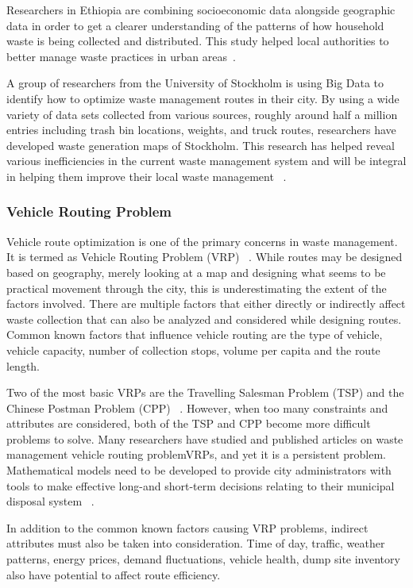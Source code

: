 \documentclass[sigconf]{acmart}
\begin{document}
Researchers in Ethiopia are combining socioeconomic data alongside geographic data in order to get a clearer understanding of the patterns of how household waste is being collected and distributed. This study helped local authorities to better manage waste practices in urban areas~\cite{markvan2016}. 

A group of researchers from the University of Stockholm is using Big Data to identify how to optimize waste management routes in their city. By using a wide variety of data sets collected from various sources, roughly around half a million entries including trash bin locations, weights, and truck routes, researchers have developed waste generation maps of Stockholm. This research has helped reveal various inefficiencies in the current waste management system and will be integral in helping them improve their local waste management ~\cite{markvan2016}.

\subsubsection{Vehicle Routing Problem}
Vehicle route optimization is one of the primary concerns in waste management. It is termed as Vehicle Routing Problem (VRP) ~\cite{dantzig1959}.   While routes may be designed based on geography, merely looking at a map and designing what seems to be practical movement through the city, this is underestimating the extent of the factors involved.  There are multiple factors that either directly or indirectly affect waste collection that can also be analyzed and considered while designing routes. Common known factors that influence vehicle routing are the type of vehicle, vehicle capacity, number of collection stops, volume per capita and the route length. 

Two of the most basic VRPs are the Travelling Salesman Problem (TSP) and the Chinese Postman Problem (CPP) ~\cite{belien2012}. However, when too many constraints and attributes are considered, both of the TSP and CPP become more difficult problems to solve. Many researchers have studied and published articles on waste management vehicle routing problemVRPs, and yet it is a persistent problem. Mathematical models need to be developed to provide city administrators with tools to make effective long-and short-term decisions relating to their municipal disposal system ~\cite{bhat1996}. 

In addition to the common known factors causing VRP problems, indirect attributes must also be taken into consideration.  Time of day, traffic, weather patterns, energy prices, demand fluctuations, vehicle health, dump site inventory also have potential to affect route efficiency. 
\end{document}
